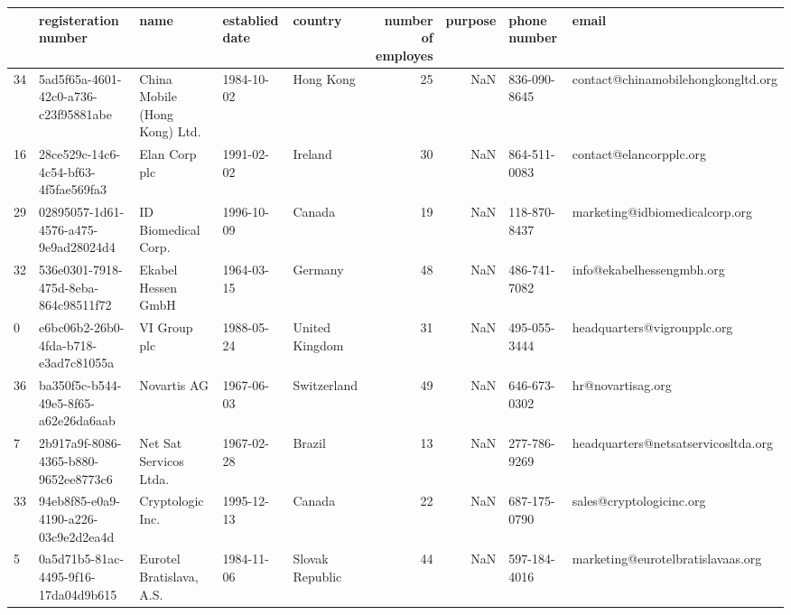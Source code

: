 \begin{tabular}{lllllrrll}
\toprule
{} &                  registeration number &                                      name & establied date &          country &  number of employes &  purpose &  phone number &                                             email \\
\midrule
34 &  5ad5f65a-4601-42c0-a736-c23f95881abe &             China Mobile (Hong Kong) Ltd. &     1984-10-02 &        Hong Kong &                  25 &      NaN &  836-090-8645 &                contact@chinamobilehongkongltd.org \\
16 &  28ce529c-14c6-4c54-bf63-4f5fae569fa3 &                             Elan Corp plc &     1991-02-02 &          Ireland &                  30 &      NaN &  864-511-0083 &                           contact@elancorpplc.org \\
29 &  02895057-1d61-4576-a475-9e9ad28024d4 &                       ID Biomedical Corp. &     1996-10-09 &           Canada &                  19 &      NaN &  118-870-8437 &                    marketing@idbiomedicalcorp.org \\
32 &  536e0301-7918-475d-8eba-864c98511f72 &                        Ekabel Hessen GmbH &     1964-03-15 &          Germany &                  48 &      NaN &  486-741-7082 &                         info@ekabelhessengmbh.org \\
0  &  e6bc06b2-26b0-4fda-b718-e3ad7c81055a &                              VI Group plc &     1988-05-24 &   United Kingdom &                  31 &      NaN &  495-055-3444 &                       headquarters@vigroupplc.org \\
36 &  ba350f5c-b544-49e5-8f65-a62e26da6aab &                               Novartis AG &     1967-06-03 &      Switzerland &                  49 &      NaN &  646-673-0302 &                                 hr@novartisag.org \\
7  &  2b917a9f-8086-4365-b880-9652ee8773c6 &                    Net Sat Servicos Ltda. &     1967-02-28 &           Brazil &                  13 &      NaN &  277-786-9269 &               headquarters@netsatservicosltda.org \\
33 &  94eb8f85-e0a9-4190-a226-03c9e2d2ea4d &                          Cryptologic Inc. &     1995-12-13 &           Canada &                  22 &      NaN &  687-175-0790 &                          sales@cryptologicinc.org \\
5  &  0a5d71b5-81ac-4495-9f16-17da04d9b615 &                  Eurotel Bratislava, A.S. &     1984-11-06 &  Slovak Republic &                  44 &      NaN &  597-184-4016 &                 marketing@eurotelbratislavaas.org \\

\end{tabular}
